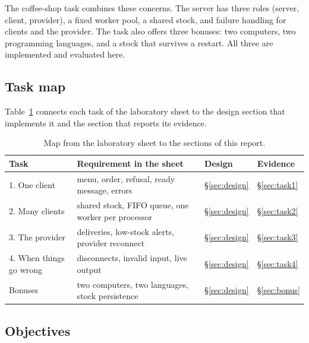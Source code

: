 \documentclass[12pt,a4paper]{article}
\begin{document}
The coffee-shop task combines these concerns. The server has three roles
(server, client, provider), a fixed worker pool, a shared stock, and failure
handling for clients and the provider. The task also offers three bonuses: two
computers, two programming languages, and a stock that survives a restart. All
three are implemented and evaluated here.

\subsection{Task map}

Table~\ref{tab:taskmap} connects each task of the laboratory sheet to the
design section that implements it and the section that reports its evidence.

\begin{table}[H]
\centering
\small
\begin{tabularx}{\textwidth}{@{}l X l l@{}}
\toprule
Task & Requirement in the sheet & Design & Evidence \\
\midrule
1. One client & menu, order, refusal, ready message, errors & \S\ref{sec:design} & \S\ref{sec:task1} \\
2. Many clients & shared stock, FIFO queue, one worker per processor & \S\ref{sec:design} & \S\ref{sec:task2} \\
3. The provider & deliveries, low-stock alerts, provider reconnect & \S\ref{sec:design} & \S\ref{sec:task3} \\
4. When things go wrong & disconnects, invalid input, live output & \S\ref{sec:design} & \S\ref{sec:task4} \\
Bonuses & two computers, two languages, stock persistence & \S\ref{sec:design} & \S\ref{sec:bonus} \\
\bottomrule
\end{tabularx}
\caption{Map from the laboratory sheet to the sections of this report.}
\label{tab:taskmap}
\end{table}

\subsection{Objectives}
\end{document}

